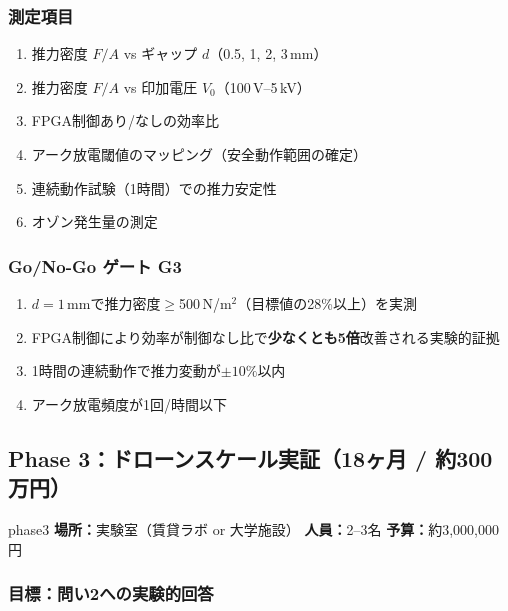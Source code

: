 \documentclass[12pt,a4paper]{ltjsarticle}
\begin{document}
\subsubsection{測定項目}
\begin{enumerate}[leftmargin=2em]
  \item 推力密度 $F/A$ vs ギャップ $d$（0.5, 1, 2, 3\,mm）
  \item 推力密度 $F/A$ vs 印加電圧 $V_0$（100\,V--5\,kV）
  \item FPGA制御あり/なしの効率比
  \item アーク放電閾値のマッピング（安全動作範囲の確定）
  \item 連続動作試験（1時間）での推力安定性
  \item オゾン発生量の測定
\end{enumerate}

\subsubsection{Go/No-Go ゲート G3}

\begin{successbox}[G3通過条件]
\begin{enumerate}[leftmargin=2em]
  \item $d = 1$\,mmで推力密度$\geq$500\,N/m$^2$（目標値の28\%以上）を実測
  \item FPGA制御により効率が制御なし比で\textbf{少なくとも5倍}改善される実験的証拠
  \item 1時間の連続動作で推力変動が$\pm 10\%$以内
  \item アーク放電頻度が1回/時間以下
\end{enumerate}
\end{successbox}

\newpage
\subsection{Phase 3：ドローンスケール実証（18ヶ月 / 約300万円）}

\begin{phasebox}{phase3}
\textbf{場所：}実験室（賃貸ラボ or 大学施設） \quad
\textbf{人員：}2--3名 \quad
\textbf{予算：}約3,000,000円
\end{phasebox}

\subsubsection{目標：問い2への実験的回答}
\end{document}
